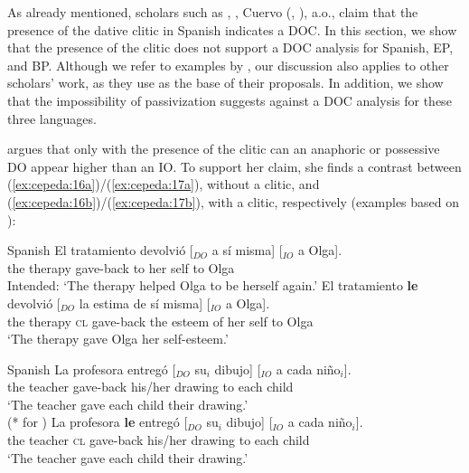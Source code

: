 \documentclass[output=paper,colorlinks,citecolor=brown]{./langscibook}
\begin{document}
As already mentioned, scholars such as \citet{Demonte1995}, \citet{Bleam2003}, Cuervo (\citeyear{Cuervo2003}, \citeyear{Cuervo2010Proceedings}), a.o., claim that the presence of the dative clitic in Spanish indicates a DOC. In this section, we show that the presence of the clitic does not support a DOC analysis for Spanish, EP, and BP. Although we refer to examples by \citet{Demonte1995}, our discussion also applies to other scholars’ work, as they use \citet{Demonte1995} as the base of their proposals. In addition, we show that the impossibility of passivization suggests against a DOC analysis for these three languages.

\citet{Demonte1995} argues that only with the presence of the clitic can an anaphoric or possessive DO appear higher than an IO. To support her claim, she finds a contrast between (\ref{ex:cepeda:16a})/(\ref{ex:cepeda:17a}), without a clitic, and (\ref{ex:cepeda:16b})/(\ref{ex:cepeda:17b}), with a clitic, respectively (examples based on \citeauthor{Demonte1995}):

\ea%
    \label{ex:cepeda:16} Spanish
	\ea\label{ex:cepeda:16a}
	\gll El tratamiento devolvió [$_{DO}$ a sí  misma] [$_{IO}$ a Olga].\\
		the therapy      gave-back \hspaceThis{[$_{DO}$} to her self \hspaceThis{[$_{IO}$} to Olga\\
	\glt Intended: ‘The therapy helped Olga to be herself again.’
	\ex\label{ex:cepeda:16b}
	\gll El tratamiento \textbf{le} devolvió [$_{DO}$ la estima  de sí  misma] [$_{IO}$ a Olga].\\
		the therapy \textsc{cl} gave-back \hspaceThis{[$_{DO}$} the esteem of her self \hspaceThis{[$_{IO}$} to Olga\\
	\glt ‘The therapy gave Olga her self-esteem.’
	\z
\z

\ea%
    \label{ex:cepeda:17} 
    Spanish
	\ea\label{ex:cepeda:17a}
	\gll La  profesora entregó [$_{DO}$ su$_i$ dibujo] [$_{IO}$ a  cada  niño$_i$].\\
		the teacher gave-back \hspaceThis{[$_{DO}$} his/her drawing \hspaceThis{[$_{IO}$} to each child\\
	\glt ‘The teacher gave each child their drawing.’\\
			(* for \citeauthor{Demonte1995})
	\ex\label{ex:cepeda:17b}
	\gll  La  profesora \textbf{le} entregó [$_{DO}$ su$_i$ dibujo] [$_{IO}$ a  cada  niño$_i$].\\
		the teacher \textsc{cl}  gave-back \hspaceThis{[$_{DO}$} his/her drawing \hspaceThis{[$_{IO}$} to each child\\
	\glt ‘The teacher gave each child their drawing.’
	\z
\z
\end{document}
